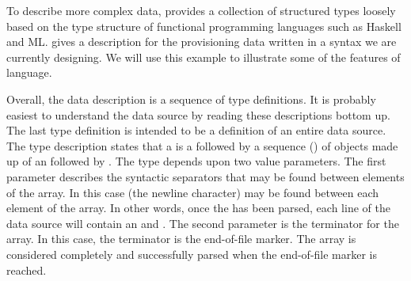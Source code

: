 \documentclass[11pt]{article}
\begin{document}
To describe more complex data, \datatype{} provides a collection of
structured types loosely based on the type structure of functional
programming languages such as Haskell and ML.  
 gives a \datatype{} description for the
\dibbler{} provisioning data written in a syntax we are currently
designing.  We will use this example to illustrate some of the
features of \datatype{} language.  

Overall, the \datatype{} data
description is a sequence of type definitions.
It is probably easiest to understand the data source by
reading these descriptions bottom up.
The last type definition  is intended to be
a definition of an entire \dibbler{} data source.  The
type description states that a  is a
 followed by a sequence () of objects
made up of an  followed by .
The  type depends upon two value parameters.
The first parameter describes the syntactic separators 
that may be found between elements of the array.  In this
case  (the newline character) may be found between
each element of the array.  In other words, once 
the  has been parsed, each line
of the data source will contain an 
 and .  The second parameter
is the terminator for the array.  In this case,
the terminator is the end-of-file marker.  The array
is considered completely and successfully parsed when 
the end-of-file marker is reached.


% 
\end{document}
